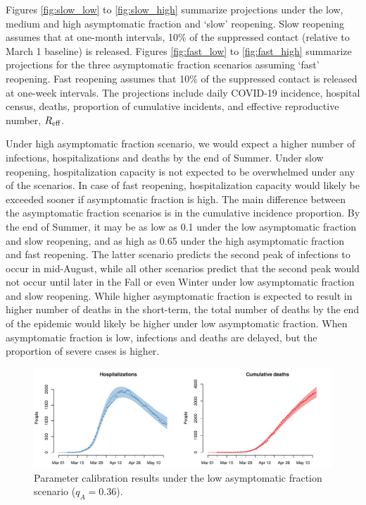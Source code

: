 \documentclass[11pt]{article}
\begin{document}
Figures \ref{fig:slow_low} to \ref{fig:slow_high} summarize projections under the low, medium and high asymptomatic fraction and `slow' reopening. Slow reopening assumes that at one-month intervals, 10\% of the suppressed contact (relative to March 1 baseline) is released. Figures \ref{fig:fast_low} to \ref{fig:fast_high} summarize projections for the three asymptomatic fraction scenarios assuming `fast' reopening. Fast reopening assumes that 10\% of the suppressed contact is released at one-week intervals. The projections include daily COVID-19 incidence, hospital census, deaths, proportion of cumulative incidents, and effective reproductive number, $R\textsubscript{eff}$. 

Under high asymptomatic fraction scenario, we would expect a higher number of infections, hospitalizations and deaths by the end of Summer. 
Under slow reopening, hospitalization capacity is not expected to be overwhelmed under any of the scenarios. 
In case of fast reopening, hospitalization capacity would likely be exceeded sooner if asymptomatic fraction is high. 
The main difference between the asymptomatic fraction scenarios is in the cumulative incidence proportion. By the end of Summer, it may be as low as 0.1 under the low asymptomatic fraction and slow reopening, and as high as 0.65 under the high asymptomatic fraction and fast reopening. The latter scenario predicts the second peak of infections to occur in mid-August, while all other scenarios predict that the second peak would not occur until later in the Fall or even Winter under low asymptomatic fraction and slow reopening. While higher asymptomatic fraction is expected to result in higher number of deaths in the short-term, the total number of deaths by the end of the epidemic would likely be higher under low asymptomatic fraction. When asymptomatic fraction is low, infections and deaths are delayed, but the proportion of severe cases is higher. 


\begin{figure} %
	\centering
	\includegraphics[width=.8\textwidth]{figures/calibration.pdf}
	\caption{Parameter calibration results under the low asymptomatic fraction scenario ($q_A = 0.36$).}
	\label{fig:fit}
\end{figure}
\end{document}
